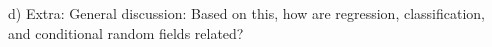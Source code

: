 d) Extra: General discussion: Based on this, how are regression, classification, and conditional random fields related?











